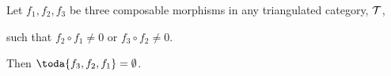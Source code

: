 \begin{proposition}
	Let \( f_1, f_2, f_3 \) be three composable morphisms in any triangulated category, \( {\mathcal{T}} \),
	\begin{center}
	\end{center}
	such that \( f_2 \circ f_1 \neq 0 \) or \( f_3 \circ f_2 \neq 0 \).

	Then \( \toda{f_3, f_2, f_1} = \emptyset \).
\end{proposition}
